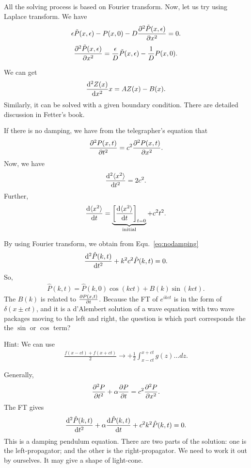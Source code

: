 All the solving process is based on Fourier transform. Now, let us try using Laplace transform. We have
\begin{align}
\epsilon \tilde{P} (x,\epsilon) - P(x,0) -D\frac{\partial^2 {\tilde{P}(x,\epsilon)}}{\partial {x}^2} = 0.
\end{align}
\begin{align}
\frac{\partial^2 {\tilde{P}(x,\epsilon)}}{\partial {x}^2} = \frac{\epsilon}{D}  \tilde{P} (x,\epsilon) - \frac{1}{D} P(x,0).
\end{align}

We can get
\begin{align}
\frac{{\mathrm d}^2 {Z(x)}}{{\mathrm d}x^2}{x} = A Z(x) -B (x).
\end{align}
Similarly, it can be solved with a given boundary condition. There are detailed discussion in Fetter's book. 

If there is no damping, we have from the telegrapher's equation that
\begin{align}
\frac{\partial^2 {P(x,t)}}{\partial t^2} = c^2 \frac{\partial^2 {P(x,t)}}{\partial {x}^2}. \label{eq:nodamping}
\end{align}
Now, we have
\begin{align}
\frac{{\mathrm d}^2 {\mathinner{\langle{x^2}\rangle}}}{{\mathrm d}t^2} = 2c^2.
\end{align}
Further, 
\begin{align}
\frac{{\mathrm d} {\mathinner{\langle{x^2}\rangle}}}{{\mathrm d}t} = \underbrace{\left[ \frac{{\mathrm d} {\mathinner{\langle{x^2}\rangle}}}{{\mathrm d}t} \right]_{t=0}}_{\textrm{initial}} + c^2 t^2. 
\end{align}

By using Fourier transform, we obtain from Equ.~\ref{eq:nodamping}
\begin{align}
\frac{{\mathrm d}^2 {\hat{P}(k,t)}}{{\mathrm d}t^2} + k^2 c^2 \hat{P}(k,t) = 0.
\end{align}
So,
\begin{align}
\hat{P}(k,t) = \hat{P}(k,0) \cos (kct) + B(k) \sin(kct).
\end{align}
The $ B(k) $ is related to $ \frac{\partial {P(x,t)}}{\partial t} $. Because the FT of $ e^{ikct} $ is in the form of $ \delta(x\pm ct) $, and it is a d'Alembert solution of a wave equation with two wave packages moving to the left and right, the question is which part corresponds the the $ \sin $ or $ \cos $ term?


Hint: We can use
\begin{align}
\frac{f(x-ct)+f(x+ct)}{2}\rightarrow +\frac{1}{2} \int_{x-ct}^{x+ct} g(z) \ldots dz.
\end{align}

Generally, 
\begin{align}
\frac{\partial^2 {P}}{\partial t^2} + \alpha \frac{\partial {P}}{\partial t} = c^2 \frac{\partial^2 {P}}{\partial {x}^2}.
\end{align}
The FT gives
\begin{align}
\frac{{\mathrm d}^2 {\hat{P}(k,t)}}{{\mathrm d}t^2} + \alpha \frac{{\mathrm d} {\hat{P}(k,t)}}{{\mathrm d}t} + c^2 k^2 \hat{P}(k,t) = 0.
\end{align}
This is a damping pendulum equation. 
There are two parts of the solution: one is the left-propagator; and the other is the right-propagator. We need to work it out by ourselves. It may give a shape of light-cone. 

